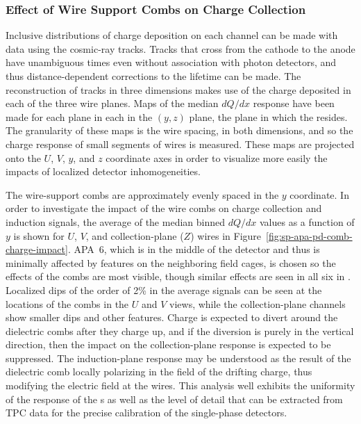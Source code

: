 


\subsubsection{Effect of Wire Support Combs on Charge Collection}
\label{sec:fdsp-apa-qa-protodune-ops-combs-charge}

Inclusive distributions of charge deposition on each channel can be made with  data using the cosmic-ray tracks.  Tracks that cross from the cathode to the anode have unambiguous times even without association with photon detectors, and thus distance-dependent corrections to the lifetime can be made.  The reconstruction of tracks in three dimensions makes use of the charge deposited in each of the three wire planes.  Maps of the median $dQ/dx$ response have been made for each plane in each  in the $(y,z)$ plane, the plane in which the  resides.  The granularity of these maps is the wire spacing, in both dimensions, and so the charge response of small segments of wires is measured.  These maps are projected onto the $U$, $V$, $y$, and $z$ coordinate axes in order to visualize more easily the impacts of localized detector inhomogeneities.

The wire-support combs are approximately evenly spaced in the $y$ coordinate.  In order to investigate the impact of the wire combs on charge collection and induction signals, the average of the median binned $dQ/dx$ values as a function of $y$ is shown for $U$, $V$, and collection-plane ($Z$) wires in Figure~\ref{fig:sp-apa-pd-comb-charge-impact}.  APA~6, which is in the middle of the detector and thus is minimally affected by features on the neighboring field cages, is chosen so the effects of the combs are most visible, though similar effects are seen in all six  in .  Localized dips of the order of 2\% in the average signals can be seen at the locations of the combs in the $U$ and $V$ views, while the collection-plane channels show smaller dips and other features.  Charge is expected to divert around the dielectric combs after they charge up, and if the diversion is purely in the vertical direction, then the impact on the collection-plane response is expected to be suppressed.  The induction-plane response may be understood as the result of the dielectric comb locally polarizing in the field of the drifting charge, thus modifying the electric field at the wires.  This analysis well exhibits the uniformity of the response of the  s as well as the level of detail that can be extracted from TPC data for the precise calibration of the single-phase detectors.

